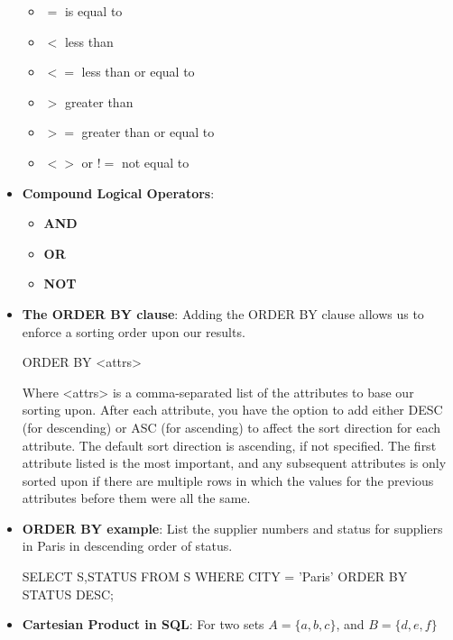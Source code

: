 \documentclass{report}
\begin{document}
\begin{itemize}
            \begin{itemize}
                \item $=$ is equal to
                \item $<$ less than
                \item $<=$ less than or equal to
                \item $>$ greater than
                \item $>=$ greater than or equal to
                \item $<>$ or $!=$ not equal to
            \end{itemize}
        \item \textbf{Compound Logical Operators}:
            \begin{itemize}
                \item \textbf{AND}
                \item \textbf{OR}
                \item \textbf{NOT}
            \end{itemize}
        \item \textbf{The ORDER BY clause}: Adding the ORDER BY clause allows us to enforce a sorting order upon our results.
            \bigbreak \noindent 
            \begin{sqlcode}
            ORDER BY <attrs>
            \end{sqlcode}
            \bigbreak \noindent 
            Where <attrs> is a comma-separated list of the attributes to base our sorting upon.
            \bigbreak \noindent 
            After each attribute, you have the option to add either DESC (for descending) or ASC (for ascending) to affect the sort direction for each attribute. The default sort direction is ascending, if not specified.
            \bigbreak \noindent 
            The first attribute listed is the most important, and any subsequent attributes is only sorted upon if there are multiple rows in which the values for the previous attributes before them were all the same.
    \item \textbf{ORDER BY example}: List the supplier numbers and status for suppliers in Paris in descending order of status.
        \bigbreak \noindent 
        \begin{sqlcode}
            SELECT S,STATUS FROM S
                WHERE CITY = 'Paris'
                ORDER BY STATUS DESC;
        \end{sqlcode}
    \item \textbf{Cartesian Product in SQL}: For two sets $A = \{a,b,c\}$, and $B=\{d,e,f\} $

\end{itemize}
\end{document}
